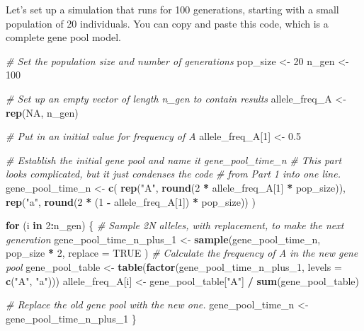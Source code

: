 \documentclass[
  a4paper]{book}
\newenvironment{Shaded}{\begin{snugshade}}{\end{snugshade}}
\newcommand{\AttributeTok}[1]{\textcolor[rgb]{0.13,0.29,0.53}{#1}}
\newcommand{\CommentTok}[1]{\textcolor[rgb]{0.56,0.35,0.01}{\textit{#1}}}
\newcommand{\ConstantTok}[1]{\textcolor[rgb]{0.56,0.35,0.01}{#1}}
\newcommand{\ControlFlowTok}[1]{\textcolor[rgb]{0.13,0.29,0.53}{\textbf{#1}}}
\newcommand{\DecValTok}[1]{\textcolor[rgb]{0.00,0.00,0.81}{#1}}
\newcommand{\FloatTok}[1]{\textcolor[rgb]{0.00,0.00,0.81}{#1}}
\newcommand{\FunctionTok}[1]{\textcolor[rgb]{0.13,0.29,0.53}{\textbf{#1}}}
\newcommand{\NormalTok}[1]{#1}
\newcommand{\OtherTok}[1]{\textcolor[rgb]{0.56,0.35,0.01}{#1}}
\newcommand{\SpecialCharTok}[1]{\textcolor[rgb]{0.81,0.36,0.00}{\textbf{#1}}}
\newcommand{\StringTok}[1]{\textcolor[rgb]{0.31,0.60,0.02}{#1}}
\begin{document}
Let's set up a simulation that runs for 100 generations, starting with a small population of 20 individuals.
You can copy and paste this code, which is a complete gene pool model.

\begin{Shaded}
\begin{Highlighting}[]
\CommentTok{\# Set the population size and number of generations}
\NormalTok{pop\_size }\OtherTok{\textless{}{-}} \DecValTok{20}
\NormalTok{n\_gen }\OtherTok{\textless{}{-}} \DecValTok{100}

\CommentTok{\# Set up an empty vector of length n\_gen to contain results}
\NormalTok{allele\_freq\_A }\OtherTok{\textless{}{-}} \FunctionTok{rep}\NormalTok{(}\ConstantTok{NA}\NormalTok{, n\_gen)}

\CommentTok{\# Put in an initial value for frequency of A}
\NormalTok{allele\_freq\_A[}\DecValTok{1}\NormalTok{] }\OtherTok{\textless{}{-}} \FloatTok{0.5}

\CommentTok{\# Establish the initial gene pool and name it gene\_pool\_time\_n}
\CommentTok{\# This part looks complicated, but it just condenses the code}
\CommentTok{\# from Part 1 into one line.}
\NormalTok{gene\_pool\_time\_n }\OtherTok{\textless{}{-}} \FunctionTok{c}\NormalTok{(}
  \FunctionTok{rep}\NormalTok{(}\StringTok{"A"}\NormalTok{, }\FunctionTok{round}\NormalTok{(}\DecValTok{2} \SpecialCharTok{*}\NormalTok{ allele\_freq\_A[}\DecValTok{1}\NormalTok{] }\SpecialCharTok{*}\NormalTok{ pop\_size)),}
  \FunctionTok{rep}\NormalTok{(}\StringTok{"a"}\NormalTok{, }\FunctionTok{round}\NormalTok{(}\DecValTok{2} \SpecialCharTok{*}\NormalTok{ (}\DecValTok{1} \SpecialCharTok{{-}}\NormalTok{ allele\_freq\_A[}\DecValTok{1}\NormalTok{]) }\SpecialCharTok{*}\NormalTok{ pop\_size))}
\NormalTok{)}

\ControlFlowTok{for}\NormalTok{ (i }\ControlFlowTok{in} \DecValTok{2}\SpecialCharTok{:}\NormalTok{n\_gen) \{}
  \CommentTok{\# Sample 2N alleles, with replacement, to make the next generation}
\NormalTok{  gene\_pool\_time\_n\_plus\_1 }\OtherTok{\textless{}{-}} \FunctionTok{sample}\NormalTok{(gene\_pool\_time\_n,}
\NormalTok{    pop\_size }\SpecialCharTok{*} \DecValTok{2}\NormalTok{,}
    \AttributeTok{replace =} \ConstantTok{TRUE}
\NormalTok{  )}
  \CommentTok{\# Calculate the frequency of A in the new gene pool}
\NormalTok{  gene\_pool\_table }\OtherTok{\textless{}{-}} \FunctionTok{table}\NormalTok{(}\FunctionTok{factor}\NormalTok{(gene\_pool\_time\_n\_plus\_1,}
                                  \AttributeTok{levels =} \FunctionTok{c}\NormalTok{(}\StringTok{"A"}\NormalTok{, }\StringTok{"a"}\NormalTok{)))}
\NormalTok{  allele\_freq\_A[i] }\OtherTok{\textless{}{-}}\NormalTok{ gene\_pool\_table[}\StringTok{"A"}\NormalTok{] }\SpecialCharTok{/} \FunctionTok{sum}\NormalTok{(gene\_pool\_table)}

  \CommentTok{\# Replace the old gene pool with the new one.}
\NormalTok{  gene\_pool\_time\_n }\OtherTok{\textless{}{-}}\NormalTok{ gene\_pool\_time\_n\_plus\_1}
\NormalTok{\}}
\end{Highlighting}
\end{Shaded}
\end{document}
